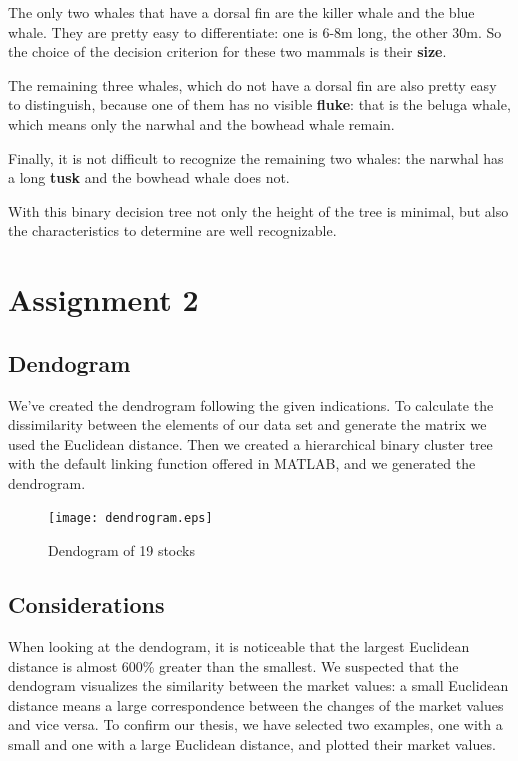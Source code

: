 \documentclass[a4paper]{article}
\begin{document}
The only two whales that have a dorsal fin are the killer whale and the blue whale. They are pretty easy to differentiate: one is 6-8m long, the other 30m. So the choice of the decision criterion for these two mammals is their \textbf{size}.

The remaining three whales, which do not have a dorsal fin are also pretty easy to distinguish, because one of them has no visible \textbf{fluke}: that is the beluga whale, which means only the narwhal and the bowhead whale remain.

Finally, it is not difficult to recognize the remaining two whales: the narwhal has a long \textbf{tusk} and the bowhead whale does not.

With this binary decision tree not only the height of the tree is minimal, but also the characteristics to determine are well recognizable.


\section{Assignment 2}

\subsection{Dendogram}

We've created the dendrogram following the given indications. To calculate the dissimilarity between the elements of our data set and generate the matrix we used the Euclidean distance. Then we created a hierarchical binary cluster tree with the default linking function offered in MATLAB, and we generated the dendrogram.

\begin{figure}[H]
\begin{center}
\texttt{[image: dendrogram.eps]}
\end{center}
\caption{Dendogram of 19 stocks}
\end{figure}

\subsection{Considerations}

When looking at the dendogram, it is noticeable that the largest Euclidean distance is almost 600\% greater than the smallest. We suspected that the dendogram visualizes the similarity between the market values: a small Euclidean distance means a large correspondence between the changes of the market values and vice versa. To confirm our thesis, we have selected two examples, one with a small and one with a large Euclidean distance, and plotted their market values.
\end{document}
